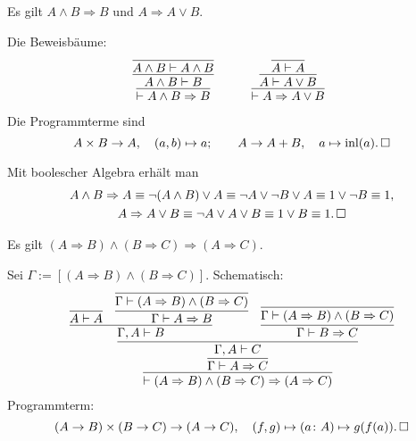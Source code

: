 \begin{Satz}\label{from-conj}
Es gilt $A\land B\Rightarrow B$ und $A\Rightarrow A\lor B$.
\end{Satz}
\begin{Beweis}[Beweis 1]
Die Beweisbäume:
\[
\begin{array}{@{}l@{\qquad\quad}l}
\infer{\vdash A\land B\Rightarrow B}{
  \infer{A\land B\vdash B}{
    \infer{A\land B\vdash A\land B}{}}}
&
\infer{\vdash A\Rightarrow A\lor B}{
  \infer{A\vdash A\lor B}{
    \infer{A\vdash A}{}}}
\end{array}
\]
Die Programmterme sind
\[
A\times B\to A,\quad (a,b)\mapsto a;\qquad
A\to A+B,\quad a\mapsto\operatorname{inl}(a).\,\square\]
\end{Beweis}
\begin{Beweis}
Mit boolescher Algebra erhält man
\begin{gather*}
A\land B\Rightarrow A\equiv \neg(A\land B)\lor A
\equiv \neg A\lor\neg B\lor A
\equiv 1\lor\neg B\equiv 1,\\
A\Rightarrow A\lor B\equiv \neg A\lor A\lor B
\equiv 1\lor B\equiv 1.\,\square
\end{gather*}
\end{Beweis}

\newpage

\begin{Satz}\newlinefirst
Es gilt
$(A\Rightarrow B) \land (B\Rightarrow C) \Rightarrow (A\Rightarrow C)$.
\end{Satz}
\begin{Beweis}[Beweis]
Sei $\Gamma:=[(A\Rightarrow B) \land (B\Rightarrow C)]$. Schematisch:
\[
\infer{\vdash (A\Rightarrow B) \land (B\Rightarrow C) \Rightarrow (A\Rightarrow C)}{
  \infer{\Gamma\vdash A\Rightarrow C}{
    \infer{\Gamma,A\vdash C}{
     \infer{\Gamma,A\vdash B}{\infer{A\vdash A}{}
     & \infer{\Gamma\vdash A\Rightarrow B}{
         \infer{\Gamma\vdash (A\Rightarrow B)\land (B\Rightarrow C)}{}}}
     & \infer{\Gamma\vdash B\Rightarrow C}{
         \infer{\Gamma\vdash (A\Rightarrow B)\land (B\Rightarrow C)}{}}}}}
\]
Programmterm:
\[(A\to B)\times (B\to C)\to (A\to C),\quad
(f, g)\mapsto (a\colon A)\mapsto g(f(a)).\,\square\]
\end{Beweis}


